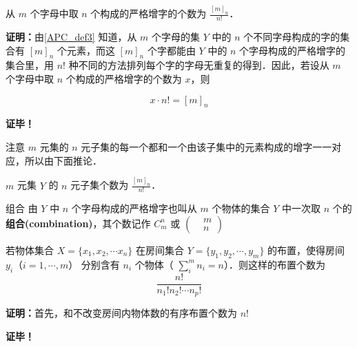 \begin{theorem}{}\label{APC_the3}
从 $m$ 个字母中取 $n$ 个构成的严格增字的个数为 $\frac{[m]_n}{n!}$．
\end{theorem}
\textbf{证明：}由\autoref{APC_def3} 知道，从 $m$ 个字母的集 $Y$ 中的 $n$ 个不同字母构成的字的集合有 $[m]_n$ 个元素，而这 $[m]_n$ 个字都能由 $Y$ 中的 $n$ 个字母构成的严格增字的集合里，用 $n!$ 种不同的方法排列每个字的字母无重复的得到．因此，若设从 $m$ 个字母中取 $n$ 个构成的严格增字的个数为 $x$，则

\begin{equation}
x\cdot n!=[m]_n
\end{equation}

\textbf{证毕！}

注意 $m$ 元集的 $n$ 元子集的每一个都和一个由该子集中的元素构成的增字一一对应，所以由下面推论．
\begin{corollary}{}
$m$ 元集 $Y$ 的 $n$ 元子集个数为 $\frac{[m]_n}{n!}$．
\end{corollary}

\begin{definition}{组合}
由 $Y$ 中 $n$ 个字母构成的严格增字也叫从 $m$ 个物体的集合 $Y$ 中一次取 $n$ 个的\textbf{组合(combination)}，其个数记作 $C_m^n$ 或 $\left(\begin{aligned}&m\\&n\end{aligned}\right)$
\end{definition}

\begin{theorem}{}
若物体集合 $X=\{x_1,x_2,\cdots x_n\}$ 在房间集合 $Y=\{y_1,y_2,\cdots,y_m\}$ 的布置，使得房间 $y_i$（$i=1,\cdots,m$） 分别含有 $n_i$ 个物体（ $\sum_{i}^m n_i=n$）．则这样的布置个数为
\begin{equation}
\frac{n!}{n_1!n_2!\cdots n_p!}
\end{equation}
 
\end{theorem}
\textbf{证明：}首先，和不改变房间内物体数的有序布置个数为 $n!$

\textbf{证毕！}